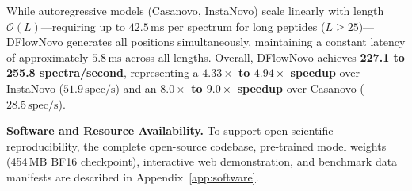 While autoregressive models (Casanovo, InstaNovo) scale linearly with length $\mathcal{O}(L)$---requiring up to $42.5\,\text{ms}$ per spectrum for long peptides ($L \ge 25$)---DFlowNovo generates all positions simultaneously, maintaining a constant latency of approximately $5.8\,\text{ms}$ across all lengths. Overall, DFlowNovo achieves \textbf{227.1 to 255.8 spectra/second}, representing a \textbf{$4.33\times$ to $4.94\times$ speedup} over InstaNovo ($51.9\,\text{spec/s}$) and an \textbf{$8.0\times$ to $9.0\times$ speedup} over Casanovo ($28.5\,\text{spec/s}$).

\noindent\textbf{Software and Resource Availability.}
To support open scientific reproducibility, the complete open-source codebase, pre-trained model weights (454\,MB BF16 checkpoint), interactive web demonstration, and benchmark data manifests are described in Appendix~\ref{app:software}.

